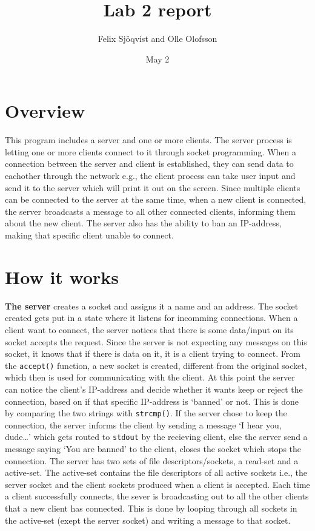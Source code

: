 \documentclass{article}
\title{Lab 2 report}
\author{Felix Sjöqvist and Olle Olofsson}
\date{May 2}
\begin{document}
\maketitle
\section{Overview}
This program includes a server and one or more clients. The server process is letting one or more clients connect to it through socket programming. When a connection between the server and client is established, they can send data to eachother through the network e.g., the client process can take user input and send it to the server which will print it out on the screen. Since multiple clients can be connected to the server at the same time, when a new client is connected, the server broadcasts a message to all other connected clients, informing them about the new client. The server also has the ability to ban an IP-address, making that specific client unable to connect.



\section{How it works}
\textbf{The server} creates a socket and assigns it a name and an address. The socket created gets put in a state where it listens for incomming connections. When a client want to connect, the server notices that there is some data/input on its socket accepts the request. Since the server is not expecting any messages on this socket, it knows that if there is data on it, it is a client trying to connect. From the \texttt{accept()} function, a new socket is created, different from the original socket, which then is used for communicating with the client. At this point the server can notice the client's IP-address and decide whether it wants keep or reject the connection, based on if that specific IP-address is `banned' or not. This is done by comparing the two strings with \texttt{strcmp()}. If the server chose to keep the connection, the server informs the client by sending a message `I hear you, dude\ldots' which gets routed to \texttt{stdout} by the recieving client, else the server send a message saying `You are banned' to the client, closes the socket which stops the connection. The server has two sets of file descriptors/sockets, a read-set and a active-set. The active-set contains the file descriptors of all active sockets i.e., the server socket and the client sockets produced when a client is accepted. Each time a client successfully connects, the sever is broadcasting out to all the other clients that a new client has connected. This is done by looping through all sockets in the active-set (exept the server socket) and writing a message to that socket. %
\end{document}
